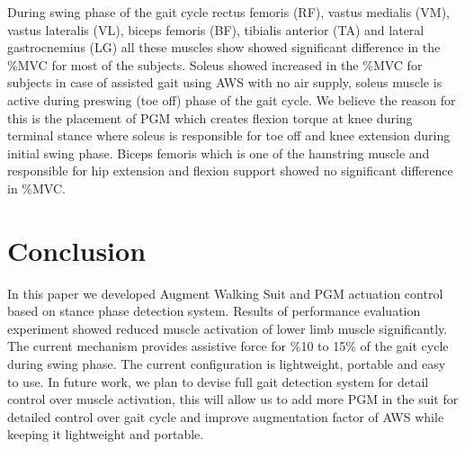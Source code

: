 \documentclass[letterpaper, 10 pt, conference]{ieeeconf}  %
\begin{document}
During swing phase of the gait cycle rectus femoris (RF), vastus medialis (VM), vastus lateralis (VL), biceps femoris (BF), tibialis anterior (TA) and lateral gastrocnemius (LG) all these muscles show showed significant difference in the \%MVC for most of the subjects. Soleus showed increased in the \%MVC for subjects in case of assisted gait using AWS with no air supply, soleus muscle is active during preswing (toe off) phase of the gait cycle. We believe the reason for this is the placement of PGM which creates flexion torque at knee during terminal stance where soleus is responsible for toe off and knee extension during initial swing phase. Biceps femoris which is one of the hamstring muscle and responsible for hip extension and flexion support showed no significant difference in \%MVC. 



\section{Conclusion} \label{conclusion}

In this paper we developed Augment Walking Suit and PGM actuation control based on stance phase detection system. Results of performance evaluation experiment showed reduced muscle activation of lower limb muscle significantly. The current mechanism provides assistive force for \%10 to 15\% of the gait cycle during swing phase. The current configuration is lightweight, portable and easy to use. In future work, we plan to devise full gait detection system for detail control over muscle activation, this will allow us to add more PGM in the suit for detailed control over gait cycle and improve augmentation factor of AWS while keeping it lightweight and portable.

\addtolength{\textheight}{-12cm}   %







\end{document}
